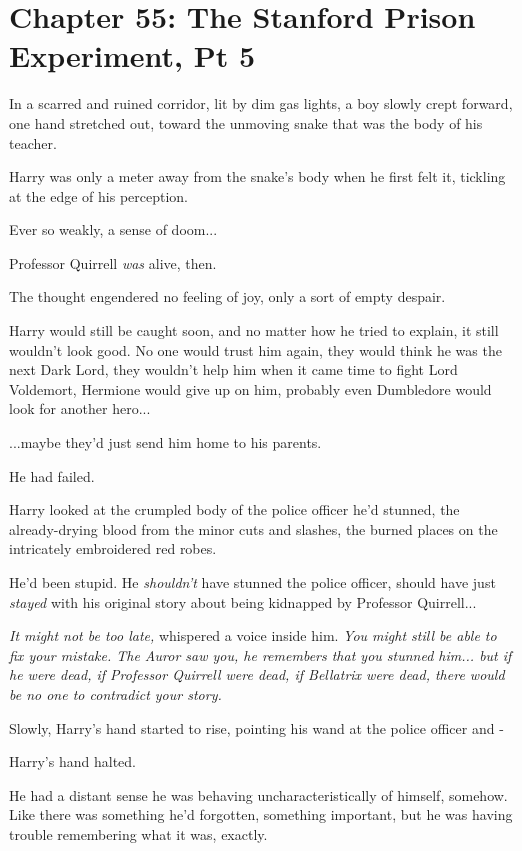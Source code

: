 \chapter{Chapter 55: The Stanford Prison Experiment, Pt 5}
In a scarred and ruined corridor, lit by dim gas lights, a boy slowly
crept forward, one hand stretched out, toward the unmoving snake that
was the body of his teacher.

Harry was only a meter away from the snake's body when he first felt it,
tickling at the edge of his perception.

Ever so weakly, a sense of doom...

Professor Quirrell \emph{was} alive, then.

The thought engendered no feeling of joy, only a sort of empty despair.

Harry would still be caught soon, and no matter how he tried to explain,
it still wouldn't look good. No one would trust him again, they would
think he was the next Dark Lord, they wouldn't help him when it came
time to fight Lord Voldemort, Hermione would give up on him, probably
even Dumbledore would look for another hero...

...maybe they'd just send him home to his parents.

He had failed.

Harry looked at the crumpled body of the police officer he'd stunned,
the already-drying blood from the minor cuts and slashes, the burned
places on the intricately embroidered red robes.

He'd been stupid. He \emph{shouldn't} have stunned the police officer,
should have just \emph{stayed} with his original story about being
kidnapped by Professor Quirrell...

\emph{It might not be too late,} whispered a voice inside him. \emph{You
might still be able to fix your mistake. The Auror saw you, he remembers
that you stunned him... but if he were dead, if Professor Quirrell
were dead, if Bellatrix were dead, there would be no one to contradict
your story.}

Slowly, Harry's hand started to rise, pointing his wand at the police
officer and -

Harry's hand halted.

He had a distant sense he was behaving uncharacteristically of himself,
somehow. Like there was something he'd forgotten, something important,
but he was having trouble remembering what it was, exactly.

